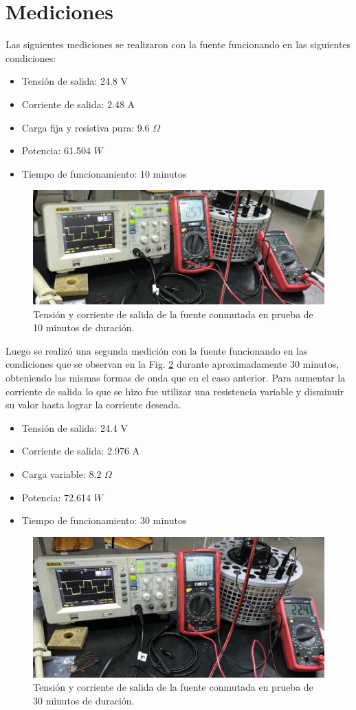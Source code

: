 \documentclass[11pt, a4paper]{article}
\begin{document}
\section{Mediciones}
Las siguientes mediciones se realizaron con la fuente funcionando en las siguientes condiciones:
\begin{itemize}
	\item Tensión de salida: 24.8 V
	\item Corriente de salida: 2.48 A
	\item Carga fija y resistiva pura: 9.6 $\Omega$
	\item Potencia: 61.504 $W$
	\item Tiempo de funcionamiento: 10 minutos	
\end{itemize}

\begin{figure}[h]
	\centering
	\includegraphics[width = 8 cm]{Imagenes/VIfuncA}
	\caption{Tensión y corriente de salida de la fuente conmutada en prueba de 10 minutos de duración.}
	\label{VIfunc}
\end{figure}

Luego se realizó una segunda medición con la fuente funcionando en las condiciones que se observan en la Fig. \ref{VIfunc} durante aproximadamente 30 minutos, obteniendo las mismas formas de onda que en el caso anterior. Para aumentar la corriente de salida lo que se hizo fue utilizar una resistencia variable y disminuir su valor hasta lograr la corriente deseada.
\begin{itemize}
	\item Tensión de salida: 24.4 V
	\item Corriente de salida: 2.976 A
	\item Carga variable: 8.2 $\Omega$
	\item Potencia: 72.614 $W$
	\item Tiempo de funcionamiento: 30 minutos	
\end{itemize}

\begin{figure}[h]
	\centering
	\includegraphics[width = 8 cm]{Imagenes/VIfuncB}
	\caption{Tensión y corriente de salida de la fuente conmutada en prueba de 30 minutos de duración.}
	\label{VIfunc}
\end{figure}
\end{document}
